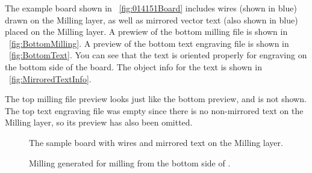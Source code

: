 \documentclass[11pt]{book}
\begin{document}
The example board  shown in \figurename~\vref{fig:014151Board} includes wires (shown in blue) drawn on the Milling layer, as well as mirrored vector text (also shown in blue) placed on the Milling layer. A prewiew of the bottom milling file is shown in \figurename~\vref{fig:BottomMilling}. A preview of the bottom text engraving file is shown in \figurename~\vref{fig:BottomText}. You can see that the text is oriented properly for engraving on the bottom side of the board. The object info for the text is shown in \figurename~\vref{fig:MirroredTextInfo}.

The top milling file preview looks just like the bottom preview, and is not shown. The top text engraving file was empty since there is no non-mirrored text on the Milling layer, so its preview has also been omitted.

\begin{figure}
	\caption{The sample board  with wires and mirrored text on the Milling layer.}
	\label{fig:014151Board}
\end{figure}

\begin{figure}
	\caption{Milling generated for milling from the bottom side of .}
	\label{fig:BottomMilling}
\end{figure}
\end{document}
